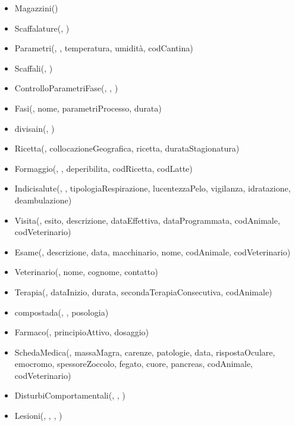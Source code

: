\documentclass[12pt,a4paper]{article}
\begin{document}
\begin{itemize}
\item Magazzini(\underline{})
\item Scaffalature(\underline{}, \underline{})
\item Parametri(\underline{}, \underline{}, temperatura, umidità,  codCantina)
\item Scaffali(\underline{}, \underline{})
\item ControlloParametriFase(\underline{}, \underline{}, \underline{})
\item Fasi(\underline{}, nome, parametriProcesso, durata)
\item divisain(\underline{}, \underline{})
\item Ricetta(\underline{}, collocazioneGeografica, ricetta, durataStagionatura)
\item Formaggio(\underline{}, \underline{}, deperibilita,  codRicetta,  codLatte)
\item Indicisalute(\underline{}, \underline{}, tipologiaRespirazione, lucentezzaPelo, vigilanza, idratazione, deambulazione)
\item Visita(\underline{}, esito, descrizione, dataEffettiva, dataProgrammata,  codAnimale,  codVeterinario)
\item Esame(\underline{},  descrizione, data, macchinario, nome,  codAnimale,  codVeterinario)
\item Veterinario(\underline{}, nome, cognome, contatto)
\item Terapia(\underline{}, dataInizio, durata, secondaTerapiaConsecutiva,  codAnimale)
\item compostada(\underline{}, \underline{}, posologia)
\item Farmaco(\underline{}, principioAttivo, dosaggio)
\item SchedaMedica(\underline{}, massaMagra, carenze, patologie, data, rispostaOculare, emocromo, spessoreZoccolo, fegato, cuore, pancreas, codAnimale,  codVeterinario)
\item DisturbiComportamentali(\underline{}, \underline{}, \underline{})
\item Lesioni(\underline{}, \underline{}, \underline{}, \underline{})

\end{itemize}
\end{document}
